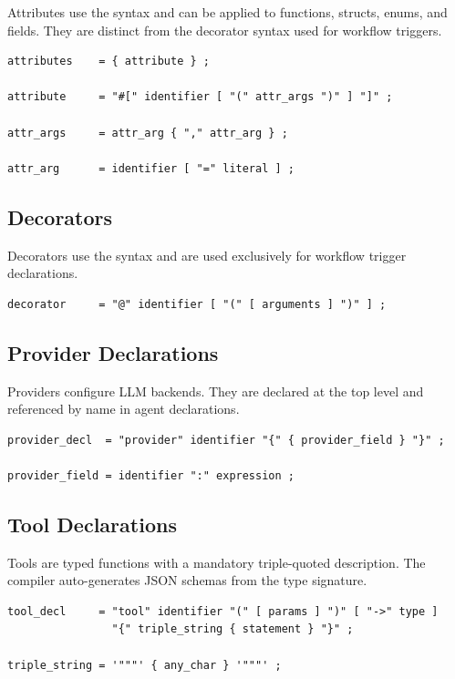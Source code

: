 Attributes use the \code{\#[...]} syntax and can be applied to functions, structs, enums, and fields. They are distinct from the  decorator syntax used for workflow triggers.

\begin{lstlisting}[language=EBNF]
attributes    = { attribute } ;

attribute     = "#[" identifier [ "(" attr_args ")" ] "]" ;

attr_args     = attr_arg { "," attr_arg } ;

attr_arg      = identifier [ "=" literal ] ;
\end{lstlisting}

\subsection{Decorators}

Decorators use the  syntax and are used exclusively for workflow trigger declarations.

\begin{lstlisting}[language=EBNF]
decorator     = "@" identifier [ "(" [ arguments ] ")" ] ;
\end{lstlisting}

\subsection{Provider Declarations}

Providers configure LLM backends. They are declared at the top level and referenced by name in agent declarations.

\begin{lstlisting}[language=EBNF]
provider_decl  = "provider" identifier "{" { provider_field } "}" ;

provider_field = identifier ":" expression ;
\end{lstlisting}

\subsection{Tool Declarations}

Tools are typed functions with a mandatory triple-quoted description. The compiler auto-generates JSON schemas from the type signature.

\begin{lstlisting}[language=EBNF]
tool_decl     = "tool" identifier "(" [ params ] ")" [ "->" type ]
                "{" triple_string { statement } "}" ;

triple_string = '"""' { any_char } '"""' ;
\end{lstlisting}

